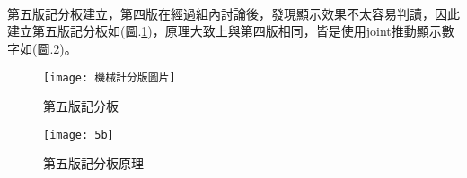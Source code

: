 \\
\\
\\
第五版記分板建立，第四版在經過組內討論後，發現顯示效果不太容易判讀，因此建立第五版記分板如(圖.\ref{第五版記分板})，原理大致上與第四版相同，皆是使用joint推動顯示數字如(圖.\ref{第五版記分板原理})。
\begin{figure}[hbt!]
\begin{center}
\texttt{[image: 機械計分版圖片]}
\caption{\Large 第五版記分板}\label{第五版記分板}
\end{center}
\end{figure}
\begin{figure}[hbt!]
\begin{center}
\newpage
\texttt{[image: 5b]}
\caption{\Large 第五版記分板原理}\label{第五版記分板原理}
\end{center}
\end{figure}